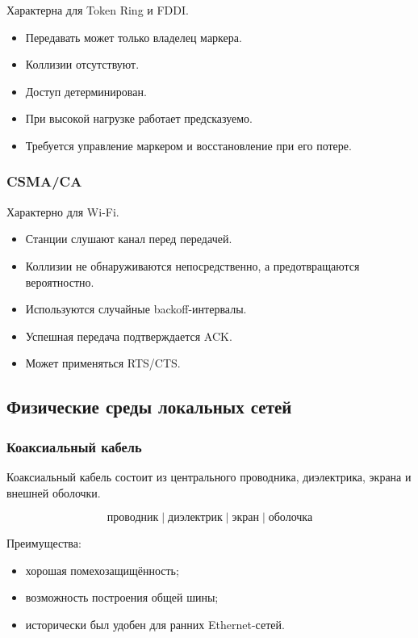 \documentclass[12pt,a4paper]{article}
\begin{document}
Характерна для Token Ring и FDDI.

\begin{itemize}
    \item Передавать может только владелец маркера.
    \item Коллизии отсутствуют.
    \item Доступ детерминирован.
    \item При высокой нагрузке работает предсказуемо.
    \item Требуется управление маркером и восстановление при его потере.
\end{itemize}

\subsubsection{CSMA/CA}

Характерно для Wi-Fi.

\begin{itemize}
    \item Станции слушают канал перед передачей.
    \item Коллизии не обнаруживаются непосредственно, а предотвращаются вероятностно.
    \item Используются случайные backoff-интервалы.
    \item Успешная передача подтверждается ACK.
    \item Может применяться RTS/CTS.
\end{itemize}

\subsection{Физические среды локальных сетей}

\subsubsection{Коаксиальный кабель}

Коаксиальный кабель состоит из центрального проводника, диэлектрика, экрана и внешней оболочки.

\[
\text{проводник} \;|\; \text{диэлектрик} \;|\; \text{экран} \;|\; \text{оболочка}
\]

Преимущества:
\begin{itemize}
    \item хорошая помехозащищённость;
    \item возможность построения общей шины;
    \item исторически был удобен для ранних Ethernet-сетей.
\end{itemize}
\end{document}
